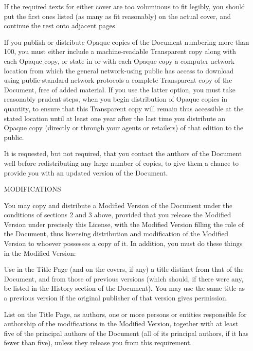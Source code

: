 If the required texts for either cover are too voluminous to fit legibly, you should put the first ones listed (as many as fit reasonably) on the actual cover, and continue the rest onto adjacent pages.

If you publish or distribute Opaque copies of the Document numbering more than 100, you must either include a machine-readable Transparent copy along with each Opaque copy, or state in or with each Opaque copy a computer-network location from which the general network-using public has access to download using public-standard network protocols a complete Transparent copy of the Document, free of added material. If you use the latter option, you must take reasonably prudent steps, when you begin distribution of Opaque copies in quantity, to ensure that this Transparent copy will remain thus accessible at the stated location until at least one year after the last time you distribute an Opaque copy (directly or through your agents or retailers) of that edition to the public.

It is requested, but not required, that you contact the authors of the Document well before redistributing any large number of copies, to give them a chance to provide you with an updated version of the Document.

\item
MODIFICATIONS

You may copy and distribute a Modified Version of the Document under the conditions of sections 2 and 3 above, provided that you release the Modified Version under precisely this License, with the Modified Version filling the role of the Document, thus licensing distribution and modification of the Modified Version to whoever possesses a copy of it.  In addition, you must do these things in the Modified Version:

\startitemize[A]
\item
Use in the Title Page (and on the covers, if any) a title distinct from that of the Document, and from those of previous versions (which should, if there were any, be listed in the History section of the Document).  You may use the same title as a previous version if the original publisher of that version gives permission.

\item
List on the Title Page, as authors, one or more persons or entities responsible for authorship of the modifications in the Modified Version, together with at least five of the principal authors of the Document (all of its principal authors, if it has fewer than five), unless they release you from this requirement.

